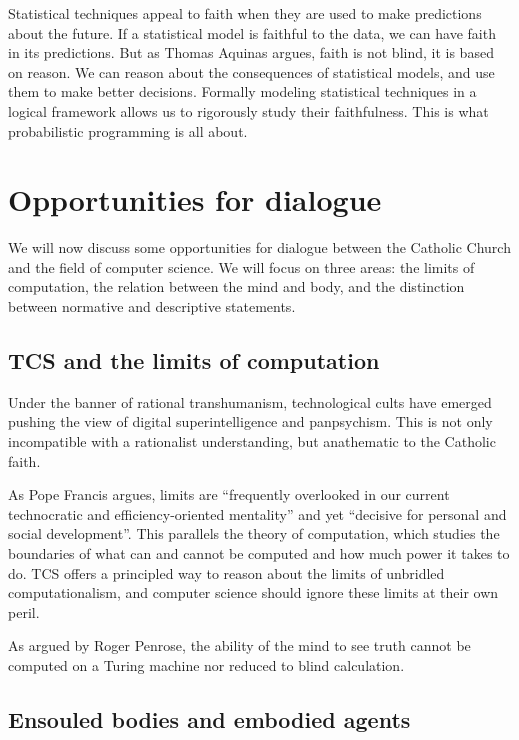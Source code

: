 \documentclass[sigplan,nonacm]{acmart}\settopmatter{printfolios=false,printccs=false,printacmref=false}
\begin{document}
  Statistical techniques appeal to faith when they are used to make predictions about the future. If a statistical model is faithful to the data, we can have faith in its predictions. But as Thomas Aquinas argues, faith is not blind, it is based on reason. We can reason about the consequences of statistical models, and use them to make better decisions. Formally modeling statistical techniques in a logical framework allows us to rigorously study their faithfulness. This is what probabilistic programming is all about.

  \section{Opportunities for dialogue}

  We will now discuss some opportunities for dialogue between the Catholic Church and the field of computer science. We will focus on three areas: the limits of computation, the relation between the mind and body, and the distinction between normative and descriptive statements.

  \subsection{TCS and the limits of computation}

  Under the banner of rational transhumanism, technological cults have emerged pushing the view of digital superintelligence and panpsychism. This is not only incompatible with a rationalist understanding, but anathematic to the Catholic faith.

  As Pope Francis argues, limits are ``frequently overlooked in our current technocratic and efficiency-oriented mentality'' and yet ``decisive for personal and social development''. This parallels the theory of computation, which studies the boundaries of what can and cannot be computed and how much power it takes to do. TCS offers a principled way to reason about the limits of unbridled computationalism, and computer science should ignore these limits at their own peril.

  As argued by Roger Penrose, the ability of the mind to see truth cannot be computed on a Turing machine nor reduced to blind calculation.

  \subsection{Ensouled bodies and embodied agents}
\end{document}
